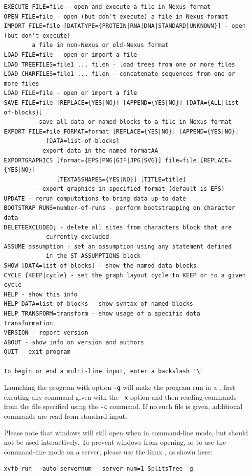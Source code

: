 \documentclass[11pt]{article}
\begin{document}
\begin{verbatim}
EXECUTE FILE=file - open and execute a file in Nexus-format
OPEN FILE=file - open (but don't execute) a file in Nexus-format
IMPORT FILE=file [DATATYPE={PROTEIN|RNA|DNA|STANDARD|UNKNOWN}] - open (but don't execute)
 		a file in non-Nexus or old-Nexus format
LOAD FILE=file - open or import a file
LOAD TREEFILES=file1 ... filen - load trees from one or more files
LOAD CHARFILES=file1 ... filen - concatenate sequences from one or more files
LOAD FILE=file - open or import a file
SAVE FILE=file [REPLACE={YES|NO}] [APPEND={YES|NO}] [DATA={ALL|list-of-blocks}]
        - save all data or named blocks to a file in Nexus format
EXPORT FILE=file FORMAT=format [REPLACE={YES|NO}] [APPEND={YES|NO}]
            [DATA=list-of-blocks]
         - export data in the named formatAA
EXPORTGRAPHICS [format={EPS|PNG|GIF|JPG|SVG}] file=file [REPLACE={YES|NO}]
               [TEXTASSHAPES={YES|NO}] [TITLE=title]
         - export graphics in specified format (default is EPS)
UPDATE - rerun computations to bring data up-to-date
BOOTSTRAP RUNS=number-of-runs - perform bootstrapping on character data
DELETEEXCLUDED; - delete all sites from characters block that are
            currently excluded
ASSUME assumption - set an assumption using any statement defined
            in the ST_ASSUMPTIONS block
SHOW [DATA=list-of-blocks] - show the named data blocks
CYCLE {KEEP|cycle} - set the graph layout cycle to KEEP or to a given cycle
HELP - show this info
HELP DATA=list-of-blocks - show syntax of named blocks
HELP TRANSFORM=transform - show usage of a specific data transformation
VERSION - report version
ABOUT - show info on version and authors
QUIT - exit program

To begin or end a multi-line input, enter a backslash '\'
\end{verbatim}

Launching the program with option {\tt -g} will make the program run
in a , first excuting any
command given with the {\tt -x} option and then reading
commands from the file specified using the {\tt -c} command.
If no such file is given, additional commands are read from standard input.

Please note that windows will still open when in command-line mode, but should not be used interactively.
To prevent windows from opening, or to use the command-line mode on a server, please use the linux ,
as shown here:

\begin{verbatim}
xvfb-run --auto-servernum --server-num=1 SplitsTree -g
\end{verbatim}
\end{document}
